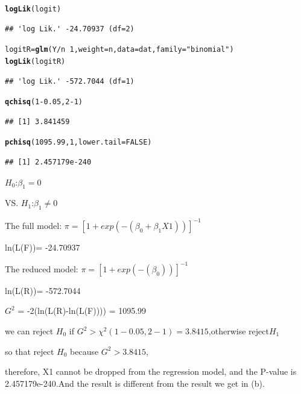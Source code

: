 \documentclass{article}\usepackage[]{graphicx}\usepackage[]{color}
\makeatletter
\newcommand{\hlnum}[1]{\textcolor[rgb]{0.686,0.059,0.569}{#1}}%
\newcommand{\hlstr}[1]{\textcolor[rgb]{0.192,0.494,0.8}{#1}}%
\newcommand{\hlopt}[1]{\textcolor[rgb]{0,0,0}{#1}}%
\newcommand{\hlstd}[1]{\textcolor[rgb]{0.345,0.345,0.345}{#1}}%
\newcommand{\hlkwb}[1]{\textcolor[rgb]{0.69,0.353,0.396}{#1}}%
\newcommand{\hlkwc}[1]{\textcolor[rgb]{0.333,0.667,0.333}{#1}}%
\newcommand{\hlkwd}[1]{\textcolor[rgb]{0.737,0.353,0.396}{\textbf{#1}}}%
\newenvironment{kframe}{%
 \def\at@end@of@kframe{}%
 \ifinner\ifhmode%
  \def\at@end@of@kframe{\end{minipage}}%
  \begin{minipage}{\columnwidth}%
 \fi\fi%
 \def\FrameCommand##1{\hskip\@totalleftmargin \hskip-\fboxsep
 \colorbox{shadecolor}{##1}\hskip-\fboxsep
     \hskip-\linewidth \hskip-\@totalleftmargin \hskip\columnwidth}%
 \MakeFramed {\advance\hsize-\width
   \@totalleftmargin\z@ \linewidth\hsize
   \@setminipage}}%
 {\par\unskip\endMakeFramed%
 \at@end@of@kframe}
\newenvironment{knitrout}{}{} %
\makeatother
\begin{document}
\begin{enumerate}[(a)]
\begin{knitrout}
\color{fgcolor}\begin{kframe}
\begin{alltt}
  \hlkwd{logLik}\hlstd{(logit)}
\end{alltt}
\begin{verbatim}
## 'log Lik.' -24.70937 (df=2)
\end{verbatim}
\begin{alltt}
  \hlstd{logitR} \hlkwb{=} \hlkwd{glm}\hlstd{(Y}\hlopt{/}\hlstd{n} \hlopt{~} \hlnum{1}\hlstd{,} \hlkwc{weight} \hlstd{= n,} \hlkwc{data} \hlstd{= dat,} \hlkwc{family} \hlstd{=} \hlstr{"binomial"}\hlstd{)}
  \hlkwd{logLik}\hlstd{(logitR)}
\end{alltt}
\begin{verbatim}
## 'log Lik.' -572.7044 (df=1)
\end{verbatim}
\begin{alltt}
  \hlkwd{qchisq}\hlstd{(}\hlnum{1}\hlopt{-}\hlnum{0.05}\hlstd{,} \hlnum{2}\hlopt{-}\hlnum{1}\hlstd{)}
\end{alltt}
\begin{verbatim}
## [1] 3.841459
\end{verbatim}
\begin{alltt}
  \hlkwd{pchisq}\hlstd{(}\hlnum{1095.99}\hlstd{,} \hlnum{1}\hlstd{,} \hlkwc{lower.tail} \hlstd{=} \hlnum{FALSE}\hlstd{)}
\end{alltt}
\begin{verbatim}
## [1] 2.457179e-240
\end{verbatim}
\end{kframe}
\end{knitrout}

\begin{center}
$H_0$:$\beta_1=0$

VS. $H_1$:$\beta_1 \ne 0$

The full model: $\pi = [1 + exp(-(\beta_0 + \beta_1 X1))]^{-1} $

ln(L(F))= -24.70937

The reduced model: $\pi = [1 + exp(-(\beta_0))]^{-1} $

ln(L(R))= -572.7044

$G^2$ = -2(ln(L(R)-ln(L(F)))) = 1095.99

we can reject $H_0$ if $G^2 > \chi^2(1-0.05, 2-1)=3.8415$,otherwise reject$H_1$

so that reject $H_0$ because $G^2 >3.8415$,

therefore, X1 cannot be dropped from the regression model, and the P-value is 2.457179e-240.And the result is different from the result we get in (b).
\end{center}

\end{enumerate}
\end{document}

